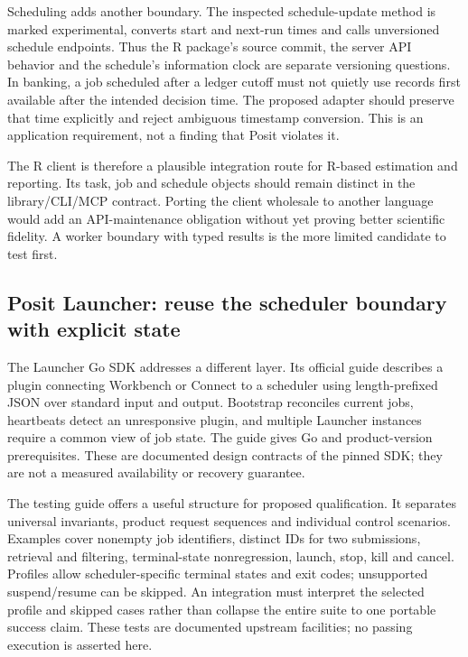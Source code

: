 Scheduling adds another boundary. The inspected schedule-update method is
marked experimental, converts start and next-run times and calls unversioned
schedule endpoints. Thus the R package's source commit, the server API
behavior and the schedule's information clock are separate versioning
questions. In banking, a job scheduled after a ledger cutoff must not quietly
use records first available after the intended decision time. The proposed
adapter should preserve that time explicitly and reject ambiguous timestamp
conversion. This is an application requirement, not a finding that Posit
violates it.
\citep{exec23_workflow_connectapi}

The R client is therefore a plausible integration route for R-based
estimation and reporting. Its task, job and schedule objects should remain
distinct in the library/CLI/MCP contract. Porting the client wholesale to
another language would add an API-maintenance obligation without yet proving
better scientific fidelity. A worker boundary with typed results is the
more limited candidate to test first.

\subsection{Posit Launcher: reuse the scheduler boundary with explicit state}
\label{exec23:clients-launcher}

The Launcher Go SDK addresses a different layer. Its official guide describes
a plugin connecting Workbench or Connect to a scheduler using length-prefixed
JSON over standard input and output. Bootstrap reconciles current jobs,
heartbeats detect an unresponsive plugin, and multiple Launcher instances
require a common view of job state. The guide gives Go and product-version
prerequisites. These are documented design contracts of the pinned SDK;
they are not a measured availability or recovery guarantee.
\citep{exec23_workflow_positgo}

The testing guide offers a useful structure for proposed qualification. It
separates universal invariants, product request sequences and individual
control scenarios. Examples cover nonempty job identifiers, distinct IDs for
two submissions, retrieval and filtering, terminal-state nonregression,
launch, stop, kill and cancel. Profiles allow scheduler-specific terminal
states and exit codes; unsupported suspend/resume can be skipped. An
integration must interpret the selected profile and skipped cases rather
than collapse the entire suite to one portable success claim. These tests
are documented upstream facilities; no passing execution is asserted here.
\citep{exec23_workflow_positgo}

